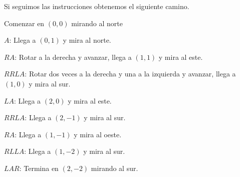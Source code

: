 \documentclass{oci}
\begin{document}
\begin{problemDescription}
Si seguimos las instrucciones obtenemos el siguiente camino.
\begin{itemize}
	{\footnotesize \item Comenzar en $(0,0)$ mirando al norte
	\item $A$:  Llega a $(0,1)$ y mira al norte.
	\item $RA$: Rotar a la derecha y avanzar, llega a $(1,1)$ y mira al este.
	\item $RRLA$: Rotar dos veces a la derecha y una a la izquierda y avanzar, llega a $(1,0)$ y mira al sur.
	\item $LA$: Llega a $(2,0)$ y mira al este.
	\item $RRLA$: Llega a $(2,-1)$ y mira al sur.
	\item $RA$: Llega a $(1,-1)$ y mira al oeste.
	\item $RLLA$: Llega a $(1,-2)$ y mira al sur.
	\item $LAR$:  Termina en $(2,-2)$ mirando al sur.}
\end{itemize}


\end{problemDescription}
\end{document}
